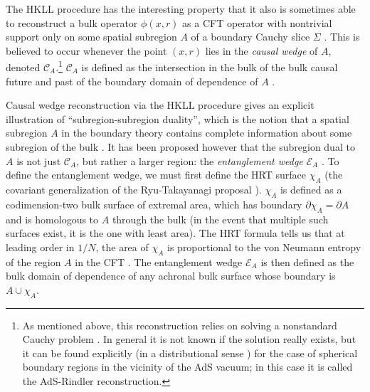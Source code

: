 \documentclass[aps,prl,twocolumn,nofootinbib,longbibliography,superscriptaddress]{revtex4-1}
\newcommand{\CA}{\mathcal{C}_A}
\newcommand{\EA}{\mathcal{E}_A}
\begin{document}
The HKLL procedure has the interesting property that it also is sometimes able to reconstruct a bulk operator $\phi(x,r)$ as a CFT operator with nontrivial support only on some spatial subregion $A$ of a boundary Cauchy slice $\Sigma$ \cite{Hamilton:2006az,Morrison:2014jha}.  This is believed to occur whenever the point $(x,r)$ lies in the \textit{causal wedge} of $A$, denoted $\CA$.\footnote{As mentioned above, this reconstruction relies on solving a nonstandard Cauchy problem \cite{Bousso:2012mh,Heemskerk:2012mn}.  In general it is not known if the solution really exists, but it can be found explicitly (in a distributional sense \cite{Morrison:2014jha}) for the case of spherical boundary regions in the vicinity of the AdS vacuum; in this case it is called the AdS-Rindler reconstruction.}  $\CA$ is defined as the intersection in the bulk of the bulk causal future and past of the boundary domain of dependence of $A$ \cite{Hubeny:2012wa}.

Causal wedge reconstruction via the HKLL procedure gives an explicit illustration of ``subregion-subregion duality'', which is the notion that a spatial subregion $A$ in the boundary theory contains complete information about some subregion of the bulk \cite{Bousso:2012sj,Czech:2012bh,Bousso:2012mh}.  It has been proposed however that the subregion dual to $A$ is not just $\mathcal{C}_A$, but rather a larger region: the \textit{entanglement wedge} $\EA$ \cite{Czech:2012bh,Wall:2012uf,Headrick:2014cta}.  To define the entanglement wedge, we must first define the HRT surface $\chi_A$ \cite{Hubeny:2007xt} (the covariant generalization of the Ryu-Takayanagi proposal \cite{Ryu:2006bv}).  $\chi_A$ is defined as a codimension-two bulk surface of extremal area, which has boundary $\partial \chi_A=\partial A$ and is homologous to $A$ through the bulk (in the event that multiple such surfaces exist, it is the one with least area).  The HRT formula tells us that at leading order in $1/N$, the area of $\chi_A$ is proportional to the von Neumann entropy of the region $A$ in the CFT \cite{Ryu:2006bv,Hubeny:2007xt,Lewkowycz:2013nqa}.  The entanglement wedge $\EA$ is then defined as the bulk domain of dependence of any achronal bulk surface whose boundary is $A \cup \chi_A$.
\end{document}
